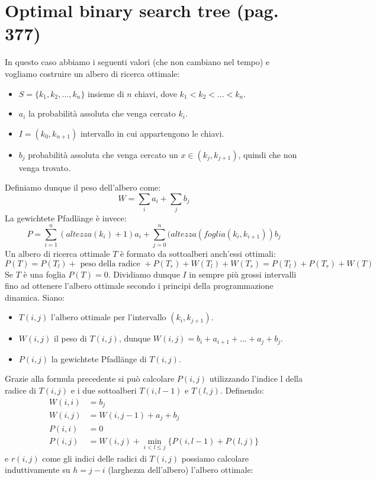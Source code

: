 \documentclass[a4paper]{book}
\begin{document}
\section{Optimal binary search tree (pag. 377)}
In questo caso abbiamo i seguenti valori (che non cambiano nel tempo) e vogliamo costruire un albero di ricerca ottimale:
\begin{itemize}
\item $S=\{k_1,k_2, ..., k_n \}$ insieme di $n$ chiavi, dove $k_1<k_2<...<k_n$.
\item $a_i$ la probabilità assoluta che venga cercato $k_i$.
\item $I=(k_0,k_{n+1})$ intervallo in cui appartengono le chiavi.
\item $b_j$ probabilità assoluta che venga cercato un $x \in (k_j, k_{j+1})$, quindi che non venga trovato.
\end{itemize}
Definiamo dunque il peso dell'albero come:
$$W=\sum_i a_i + \sum_j b_j$$
La gewichtete Pfadlänge  è invece:
$$ P= \sum_{i=1}^n (altezza(k_i)+1)a_i+\sum_{j=0}^n (altezza(foglia(k_i,k_{i+1}))b_j$$
Un albero di ricerca ottimale $T$ è formato da sottoalberi anch'essi ottimali: 
$$ P(T)= P(T_l)+\mbox{ peso della radice }+P(T_r)+W(T_l)+W(T_r)=P(T_l)+P(T_r)+W(T)$$
Se $T$ è una foglia $P(T)=0$. Dividiamo dunque $I$ in sempre più grossi intervalli fino ad ottenere l'albero ottimale secondo i principi della programmazione dinamica. Siano:
\begin{itemize}
\item $T(i,j)$ l'albero ottimale per l'intervallo $(k_i,k_{j+1})$.
\item $W(i,j)$ il peso di $T(i,j)$, dunque $W(i,j)=b_i+a_{i+1}+...+a_j+b_j$.
\item $P(i,j)$ la gewichtete Pfadlänge di $T(i,j)$.
\end{itemize}
Grazie alla formula precedente si può calcolare $P(i,j)$ utilizzando l'indice l della radice di $T(i,j)$ e i due sottoalberi $T(i,l-1)$ e $T(l,j)$. Definendo:
\begin{align*}
W(i,i)&=b_j\\
W(i,j)&=W(i,j-1)+a_j+b_j\\
P(i,i)&=0\\
P(i,j)&=W(i,j)+\min_{i<l\leq j} \{P(i,l-1)+P(l,j)\}
\end{align*}
e $r(i,j)$ come gli indici delle radici di $T(i,j)$ possiamo calcolare induttivamente su $h=j-i$ (larghezza dell'albero) l'albero ottimale:
\end{document}
